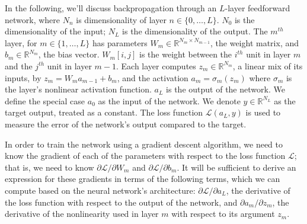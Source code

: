 In the following, we'll discuss backpropagation through an $L$-layer feedforward network, where $N_n$ is dimensionality of layer $n \in \{0, \ldots, L\}$.
$N_0$ is the dimensionality of the input; $N_L$ is the dimensionality of the output.
The $m^{th}$ layer, for $m \in \{1, \ldots, L\}$ has parameters $W_m \in \mathbb{R}^{N_m \times N_{m - 1}}$, the weight matrix, and $b_m \in \mathbb{R}^{N_m}$, the bias vector.
$W_m[i, j]$ is the weight between the $i^{th}$ unit in layer $m$ and the $j^{th}$ unit in layer $m - 1$.
Each layer computes $z_m \in \mathbb{R}^{N_m}$, a linear mix of its inputs, by $z_m = W_m a_{m - 1} + b_m$, and the activation $a_m = \sigma_m(z_m)$ where $\sigma_m$ is the layer's nonlinear activation function.
$a_L$ is the output of the network.
We define the special case $a_0$ as the input of the network.
We denote $y \in \mathbb{R}^{N_L}$ as the target output, treated as a constant.
The loss function $\mathcal{L}(a_L, y)$ is used to measure the error of the network's output compared to the target.

In order to train the network using a gradient descent algorithm, we need to know the gradient of each of the parameters with respect to the loss function $\mathcal{L}$; that is, we need to know $\partial \mathcal{L}/\partial W_m$ and $\partial \mathcal{L}/\partial b_m$.
It will be sufficient to derive an expression for these gradients in terms of the following terms, which we can compute based on the neural network's architecture: $\partial \mathcal{L}/\partial a_L$, the derivative of the loss function with respect to the output of the network, and $\partial a_m/\partial z_m$, the derivative of the nonlinearity used in layer $m$ with respect to its argument $z_m$.

